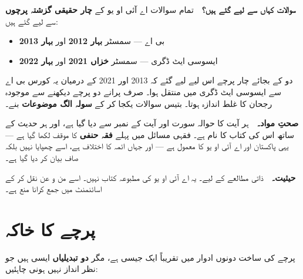 \begin{tcolorbox}[enhanced, colback=white, colframe=bmblue, boxrule=0.6pt,
                  arc=3pt, left=12pt, right=12pt, top=10pt, bottom=10pt]
\textbf{\color{bmblue}سوالات کہاں سے لیے گئے ہیں؟}\ \
تمام سوالات اے آئی او یو کے \textbf{چار حقیقی گزشتہ پرچوں} سے لیے گئے ہیں:

\smallskip
\begin{itemize}\setlength{\itemsep}{0pt}\setlength{\topsep}{2pt}
  \item بی اے --- سمسٹر \textbf{بہار \textenglish{2012}} اور \textbf{بہار
        \textenglish{2013}}
  \item ایسوسی ایٹ ڈگری --- سمسٹر \textbf{خزاں \textenglish{2021}} اور
        \textbf{بہار \textenglish{2022}}
\end{itemize}

\smallskip
دو کے بجائے چار پرچے اس لیے لیے گئے کہ \textenglish{2013} اور
\textenglish{2021} کے درمیان یہ کورس بی اے سے ایسوسی ایٹ ڈگری میں منتقل ہوا۔
صرف پرانے دو پرچے دیکھنے سے موجودہ رجحان کا غلط اندازہ ہوتا۔ بتیس سوالات
یکجا کر کے \textbf{سولہ الگ موضوعات} بنے۔

\medskip
\textbf{\color{bmblue}صحتِ مواد۔}\ \
ہر آیت کا حوالہ سورت اور آیت کے نمبر سے دیا گیا ہے، اور ہر حدیث کے ساتھ اس
کی کتاب کا نام ہے۔ فقہی مسائل میں پہلے \textbf{فقہ حنفی} کا موقف لکھا گیا ہے
--- یہی پاکستان اور اے آئی او یو کا معمول ہے --- اور جہاں ائمہ کا اختلاف ہے،
اسے چھپایا نہیں بلکہ صاف بیان کر دیا گیا ہے۔

\medskip
\textbf{\color{bmblue}حیثیت۔}\ \
ذاتی مطالعے کے لیے۔ یہ اے آئی او یو کی مطبوعہ کتاب نہیں۔ اسے من و عن نقل کر کے
اسائنمنٹ میں جمع کرانا منع ہے۔
\end{tcolorbox}

\clearpage

\section*{پرچے کا خاکہ}

پرچے کی ساخت دونوں ادوار میں تقریباً ایک جیسی ہے، مگر \textbf{دو تبدیلیاں}
ایسی ہیں جو نظر انداز نہیں ہونی چاہئیں:

